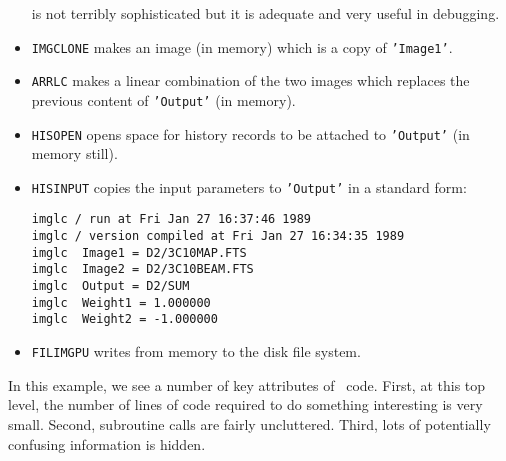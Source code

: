 \begin{itemize}
is not terribly sophisticated but it is adequate and very useful in
debugging. 
\item {\tt IMGCLONE} makes an image (in memory) which is a copy of 
{\tt 'Image1'}.
\item {\tt ARRLC} makes a linear combination of the two images
which replaces the previous content of {\tt 'Output'} (in memory).
\item {\tt HISOPEN} opens space for history records to be attached
to {\tt 'Output'} (in memory still).
\item {\tt HISINPUT} copies the input parameters to {\tt 'Output'}
in a standard form:
\begin{verbatim}
imglc / run at Fri Jan 27 16:37:46 1989
imglc / version compiled at Fri Jan 27 16:34:35 1989
imglc  Image1 = D2/3C10MAP.FTS
imglc  Image2 = D2/3C10BEAM.FTS
imglc  Output = D2/SUM
imglc  Weight1 = 1.000000
imglc  Weight2 = -1.000000
\end{verbatim}

\item {\tt FILIMGPU} writes from memory to the disk file system.
\end{itemize}
In this example, we see a number of key attributes of \sde\ code. First,
at this top level, the number of lines of code required to do something
interesting is very small. Second, subroutine calls are fairly uncluttered.
Third, lots of potentially confusing information is hidden.

